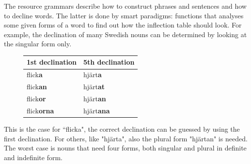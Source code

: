 \documentclass{report}
\begin{document}
The resource grammars describe how to construct phrases and sentences and how to
decline words. The latter is done by smart paradigms: functions that analyses
some given forms of a word to find out how the inflection table should look.
For example, the declination of many Swedish nouns can be determined by looking
at the singular form only. 
\begin{figure}
\begin{tabular}{| l | l |}
\hline
1st declination & 5th declination \\
\hline
flick\textbf{a}    &     hjärt\textbf{a}   \\
flick\textbf{an}    &    hjärt\textbf{at}  \\
flick\textbf{or}    &    hjärt\textbf{an}  \\
flick\textbf{orna}  &    hjärt\textbf{ana} \\
\hline
\end{tabular}
\end{figure}
This is the case for ``flicka", the correct declination
can be guessed by using the first declination. %
For others, like "hjärta", also the plural form "hjärtan" is needed.
The worst case is nouns that need four forms, both singular and
plural in definite and indefinite form.
\end{document}
